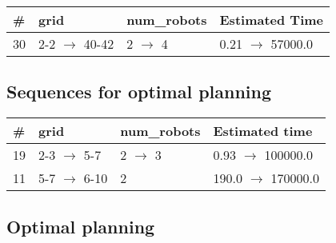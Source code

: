 \documentclass{article}
\begin{document}
                        \begin{center}
                        \begin{tabular}{@{}l|l|l|l@{}}
                        \# & grid & num\_robots & Estimated Time\\\midrule
                        30&2-2 $\rightarrow$ 40-42&2 $\rightarrow$ 4&0.21 $\rightarrow$ 57000.0
                        \end{tabular}
                        \end{center}
                    
                            \subsection*{Sequences for optimal planning}

                            \begin{center}
                            \begin{tabular}{@{}l|l|l|l@{}}
                            \# & grid & num\_robots & Estimated time\\\midrule
                            19&2-3 $\rightarrow$ 5-7&2 $\rightarrow$ 3&0.93 $\rightarrow$ 100000.0\\
11&5-7 $\rightarrow$ 6-10&2&190.0 $\rightarrow$ 170000.0
                            \end{tabular}
                            \end{center}
                    
                                \subsection*{Optimal planning}
                                
\end{document}
